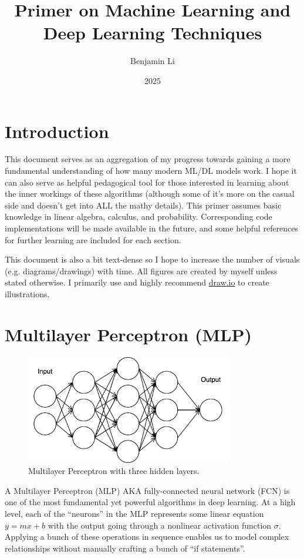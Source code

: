 \documentclass[12pt]{article}
\title{Primer on Machine Learning and Deep Learning Techniques}
\author{Benjamin Li}
\date{2025}
\begin{document}

\maketitle
\tableofcontents
\newpage

\section{Introduction}

This document serves as an aggregation of my progress towards gaining a more fundamental understanding of how many modern ML/DL models work. I hope it can also serve as helpful pedagogical tool for those interested in learning about the inner workings of these algorithms (although some of it's more on the casual side and doesn't get into ALL the mathy details). This primer assumes basic knowledge in linear algebra, calculus, and probability. Corresponding code implementations will be made available in the future, and some helpful references for further learning are included for each section. 

This document is also a bit text-dense so I hope to increase the number of visuals (e.g. diagrams/drawings) with time. All figures are created by myself unless stated otherwise. I primarily use and highly recommend \href{draw.io}{draw.io} to create illustrations. 

\newpage
\section{Multilayer Perceptron (MLP)}
\begin{figure}[H]
    \centering
    \includegraphics[width=0.8\textwidth]{../media/mlp.png}
    \caption{Multilayer Perceptron with three hidden layers.}
    \label{fig:mlp}
\end{figure}

A Multilayer Perceptron (MLP) AKA fully-connected neural network (FCN) is one of the most fundamental yet powerful algorithms in deep learning. At a high level, each of the \enquote{neurons} in the MLP represents some linear equation $y=mx+b$ with the output going through a nonlinear activation function $\sigma$. Applying a bunch of these operations in sequence enables us to model complex relationships without manually crafting a bunch of \enquote{if statements}. 
\end{document}
